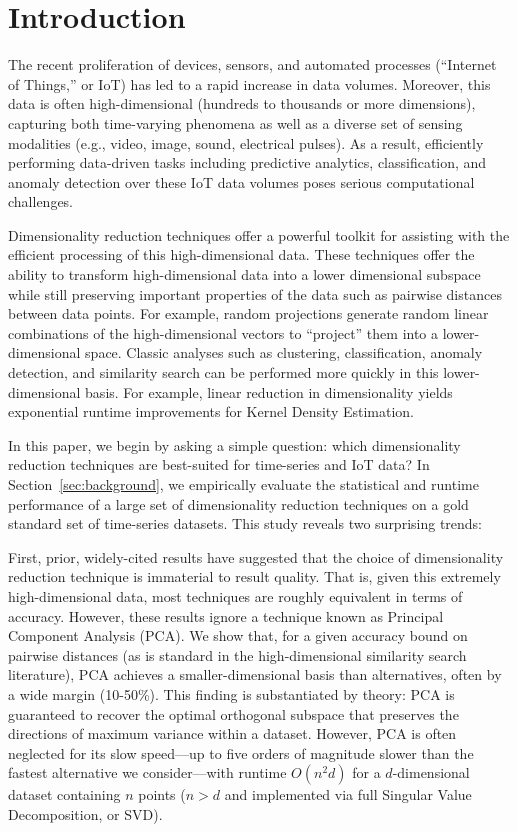 
\section{Introduction}
\label{sec:intro}

The recent proliferation of devices, sensors, and automated processes (``Internet of Things,'' or IoT) has led to a rapid increase in data volumes.
Moreover, this data is often high-dimensional (hundreds to thousands or more dimensions), capturing both time-varying phenomena as well as a diverse set of sensing modalities (e.g., video, image, sound, electrical pulses).
As a result, efficiently performing data-driven tasks including predictive analytics, classification, and anomaly detection over these IoT data volumes poses serious computational challenges.

Dimensionality reduction techniques offer a powerful toolkit for assisting with the efficient processing of this high-dimensional data.
These techniques offer the ability to transform high-dimensional data into a lower dimensional subspace while still preserving important properties of the data such as pairwise distances between data points.
For example, random projections generate random linear combinations of the high-dimensional vectors to ``project'' them into a lower-dimensional space.
Classic analyses such as clustering, classification, anomaly detection, and similarity search can be performed more quickly in this lower-dimensional basis. For example, linear reduction in dimensionality yields exponential runtime improvements for Kernel Density Estimation.

In this paper, we begin by asking a simple question: which dimensionality reduction techniques are best-suited for time-series and IoT data?
In Section~\ref{sec:background}, we empirically evaluate the statistical and runtime performance of a large set of dimensionality reduction techniques on a gold standard set of time-series datasets.
This study reveals two surprising trends:

First, prior, widely-cited results have suggested that the choice of dimensionality reduction technique is immaterial to result quality.
That is, given this extremely high-dimensional data, most techniques are roughly equivalent in terms of accuracy.
However, these results ignore a technique known as Principal Component Analysis (PCA).
We show that, for a given accuracy bound on pairwise distances (as is standard in the high-dimensional similarity search literature), PCA achieves a smaller-dimensional basis than alternatives, often by a wide margin (10-50\%).
This finding is substantiated by theory: PCA is guaranteed to recover the optimal orthogonal subspace that preserves the directions of maximum variance within a dataset.
However, PCA is often neglected for its slow speed---up to five orders of magnitude slower than the fastest alternative we consider---with runtime $O(n^2d)$ for a $d$-dimensional dataset containing $n$ points ($n>d$ and implemented via full Singular Value Decomposition, or SVD).

